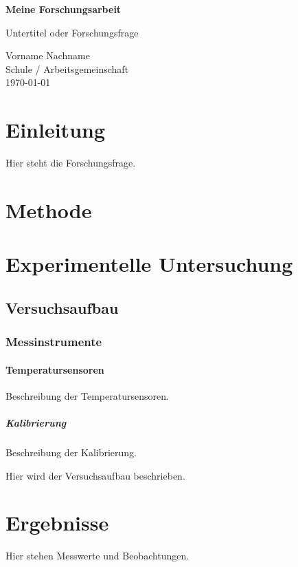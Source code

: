 \documentclass[11pt,a4paper]{scrartcl} %
\begin{document}
\begin{titlepage}
  \centering
  \vspace*{3cm} %
  {\Huge\bfseries Meine Forschungsarbeit\par} %
  \vspace{1.5cm}
  {\Large Untertitel oder Forschungsfrage\par} %
  \vfill %
  Vorname Nachname\\
  Schule / Arbeitsgemeinschaft\\
  \today %
\end{titlepage}

\begin{abstract} %
  In zwei bis vier Sätzen: Frage, Methode, Ergebnis.
\end{abstract}

\tableofcontents
\clearpage %

\section{Einleitung}
Hier steht die Forschungsfrage.
\section{Methode}
\section{Experimentelle Untersuchung}
\subsection{Versuchsaufbau}
\subsubsection{Messinstrumente}
\paragraph{Temperatursensoren}
Beschreibung der Temperatursensoren.
\subparagraph{Kalibrierung}
Beschreibung der Kalibrierung.


Hier wird der Versuchsaufbau beschrieben.
\section{Ergebnisse}
Hier stehen Messwerte und Beobachtungen.
\end{document}
